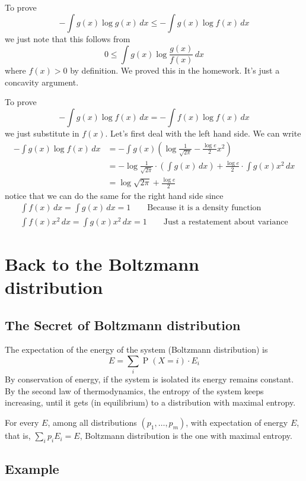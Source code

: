 \documentclass{article}
\begin{document}
To prove 
\[
-\int g(x)\log g(x)\, dx \leq -\int g(x)\log f(x)\,dx 
\]
we just note that this follows from
\[
0 \leq \int g(x) \log \frac{g(x)}{f(x)}\, dx
\]
where $f(x)> 0$ by definition. We proved this in the homework. It's just a concavity argument.

To prove 
\[
-\int g(x)\log f(x)\,dx = -\int f(x)\log f(x)\, dx
\]
we just substitute in $f(x)$. Let's first deal with the left hand side. We can write 
\begin{align*}
    -\int g(x)\log f(x)\,dx &= -\int g(x)\left(\log \frac{1}{\sqrt{2\pi}}-\frac{\log e}{2}x^2\right)\\
    &= -\log \frac{1}{\sqrt{2\pi}} \cdot \left(\int g(x)\, dx\right) + \frac{\log e}{2}\cdot \int g(x)x^2 \, dx\\
    &= \log \sqrt{2\pi} + \frac{\log e}{2}
\end{align*}
notice that we can do the same for the right hand side since 
\begin{gather*}
    \int f(x) \, dx = \int g(x) \, dx = 1\qquad\text{Because it is a density function}\\
    \int f(x)x^2 \, dx = \int g(x)x^2\, dx =1 \qquad\text{Just a restatement about variance}
\end{gather*}

\section{Back to the Boltzmann distribution}

\subsection{The Secret of Boltzmann distribution}

The expectation of the energy of the system (Boltzmann distribution) is 
\[
E = \sum_i \operatorname{P}\left(X=i\right)\cdot E_i
\]
By conservation of energy, if the system is isolated its energy remains constant. By the second law of thermodynamics, the entropy of the system keeps increasing, until it gets (in equilibrium) to a distribution with maximal entropy.

For every $E$, among all distributions $\left(p_1,\ldots,p_m\right)$, with expectation of energy $E$, that is, $\sum_i p_i E_i=E$, Boltzmann distribution is the one with maximal entropy.

\subsection{Example}
\end{document}
